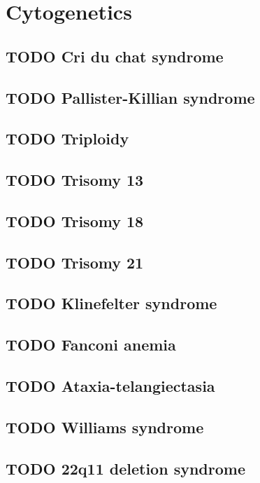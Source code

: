 \documentclass{scrartcl}
\begin{document}
\section{Cytogenetics}
\label{sec:org89be6cc}
\subsection{{\bfseries\sffamily TODO} Cri du chat syndrome}
\label{sec:org6aa1b63}
\subsection{{\bfseries\sffamily TODO} Pallister-Killian syndrome}
\label{sec:org8963a0c}
\subsection{{\bfseries\sffamily TODO} Triploidy}
\label{sec:org1bab727}
\subsection{{\bfseries\sffamily TODO} Trisomy 13}
\label{sec:orgc08759e}
\subsection{{\bfseries\sffamily TODO} Trisomy 18}
\label{sec:orgd2317b4}
\subsection{{\bfseries\sffamily TODO} Trisomy 21}
\label{sec:orgd07b934}
\subsection{{\bfseries\sffamily TODO} Klinefelter syndrome}
\label{sec:org30b9824}
\subsection{{\bfseries\sffamily TODO} Fanconi anemia}
\label{sec:org8769a2f}
\subsection{{\bfseries\sffamily TODO} Ataxia-telangiectasia}
\label{sec:org966a582}
\subsection{{\bfseries\sffamily TODO} Williams syndrome}
\label{sec:orgbbaff9f}
\subsection{{\bfseries\sffamily TODO} 22q11 deletion syndrome}
\label{sec:orgf511ef4}
\end{document}
